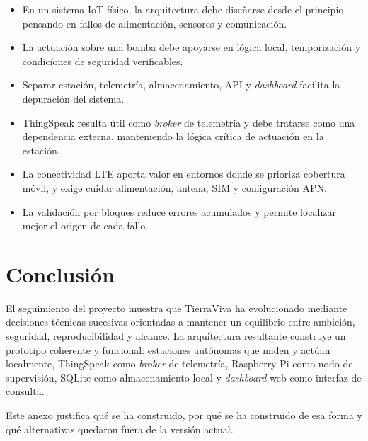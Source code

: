 \begin{itemize}
    \item En un sistema IoT físico, la arquitectura debe diseñarse desde el principio pensando en fallos de alimentación, sensores y comunicación.
    \item La actuación sobre una bomba debe apoyarse en lógica local, temporización y condiciones de seguridad verificables.
    \item Separar estación, telemetría, almacenamiento, API y \textit{dashboard} facilita la depuración del sistema.
    \item ThingSpeak resulta útil como \textit{broker} de telemetría y debe tratarse como una dependencia externa, manteniendo la lógica crítica de actuación en la estación.
    \item La conectividad LTE aporta valor en entornos donde se prioriza cobertura móvil, y exige cuidar alimentación, antena, SIM y configuración APN.
    \item La validación por bloques reduce errores acumulados y permite localizar mejor el origen de cada fallo.
\end{itemize}

\section{Conclusión}

El seguimiento del proyecto muestra que TierraViva ha evolucionado mediante decisiones técnicas sucesivas orientadas a mantener un equilibrio entre ambición, seguridad, reproducibilidad y alcance. La arquitectura resultante construye un prototipo coherente y funcional: estaciones autónomas que miden y actúan localmente, ThingSpeak como \textit{broker} de telemetría, Raspberry Pi como nodo de supervisión, SQLite como almacenamiento local y \textit{dashboard} web como interfaz de consulta.

Este anexo justifica qué se ha construido, por qué se ha construido de esa forma y qué alternativas quedaron fuera de la versión actual.